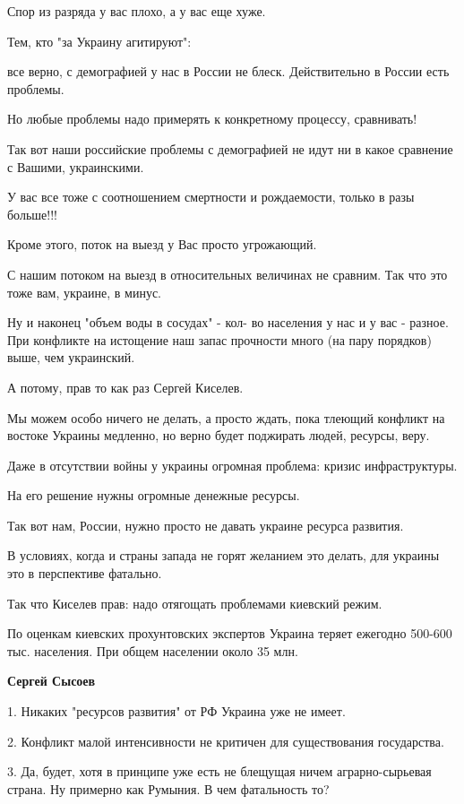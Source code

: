 \begin{itemize}
\begin{itemize}
Спор из разряда у вас плохо, а у вас еще хуже.

Тем, кто "за Украину агитируют":

все верно, с демографией у нас в России не блеск. Действительно в России есть
проблемы.

Но любые проблемы надо примерять к конкретному процессу, сравнивать!

Так вот наши российские проблемы с демографией не идут ни в какое сравнение с
Вашими, украинскими.

У вас все тоже с соотношением смертности и рождаемости, только в разы больше!!!

Кроме этого, поток на выезд у Вас просто угрожающий.

С нашим потоком на выезд в относительных величинах не сравним. Так что это тоже
вам, украине, в минус.

Ну и наконец "объем воды в сосудах" - кол- во населения у нас и у вас - разное.
При конфликте на истощение наш запас прочности много (на пару порядков) выше,
чем украинский.

А потому, прав то как раз Сергей Киселев.

Мы можем особо ничего не делать, а просто ждать, пока тлеющий конфликт на
востоке Украины медленно, но верно будет поджирать людей, ресурсы, веру.

Даже в отсутствии войны у украины огромная проблема: кризис инфраструктуры.

На его решение нужны огромные денежные ресурсы.

Так вот нам, России, нужно просто не давать украине ресурса развития.

В условиях, когда и страны запада не горят желанием это делать, для украины это
в перспективе фатально.

Так что Киселев прав: надо отягощать проблемами киевский режим.

По оценкам киевских прохунтовских экспертов Украина теряет ежегодно 500-600 тыс. населения. При общем населении около 35 млн.

\textbf{Сергей Сысоев} 

1. Никаких "ресурсов развития" от РФ Украина уже не имеет. 

2. Конфликт малой интенсивности не критичен для существования государства. 

3. Да, будет, хотя в принципе уже есть не блещущая ничем аграрно-сырьевая
страна. Ну примерно как Румыния. В чем фатальность то?



\end{itemize}
\end{itemize}
